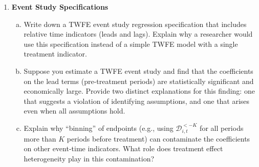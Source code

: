 \documentclass[12pt,a4paper]{article}
\begin{document}
\begin{enumerate}
\item \textbf{Event Study Specifications}
\begin{enumerate}[(a)]
\item Write down a TWFE event study regression specification that includes relative time indicators (leads and lags). Explain why a researcher would use this specification instead of a simple TWFE model with a single treatment indicator.
\item Suppose you estimate a TWFE event study and find that the coefficients on the lead terms (pre-treatment periods) are statistically significant and economically large. Provide two distinct explanations for this finding: one that suggests a violation of identifying assumptions, and one that arises even when all assumptions hold.
\item Explain why ``binning'' of endpoints (e.g., using $\mathcal{D}^{<-K}_{i,t}$ for all periods more than $K$ periods before treatment) can contaminate the coefficients on other event-time indicators. What role does treatment effect heterogeneity play in this contamination?
\end{enumerate}

\end{enumerate}
\end{document}
